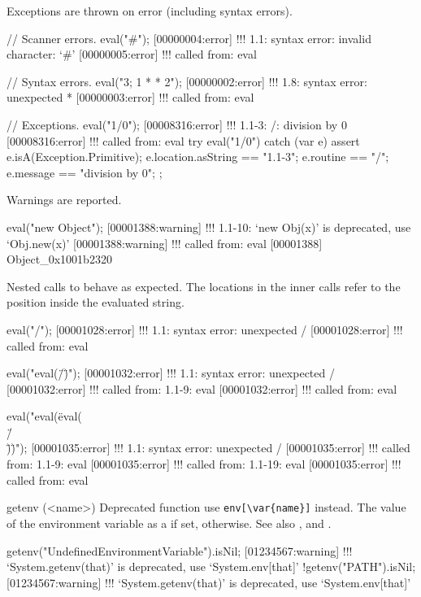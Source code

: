 \begin{urbiscriptapi}
  Exceptions are thrown on error (including syntax errors).
\begin{urbiscript}
// Scanner errors.
eval("#");
[00000004:error] !!! 1.1: syntax error: invalid character: `#'
[00000005:error] !!!    called from: eval

// Syntax errors.
eval("3; 1 * * 2");
[00000002:error] !!! 1.8: syntax error: unexpected *
[00000003:error] !!!    called from: eval

// Exceptions.
eval("1/0");
[00008316:error] !!! 1.1-3: /: division by 0
[00008316:error] !!!    called from: eval
try
{
  eval("1/0")
}
catch (var e)
{
  assert
  {
    e.isA(Exception.Primitive);
    e.location.asString  == "1.1-3";
    e.routine            == "/";
    e.message            == "division by 0";
  }
};
\end{urbiscript}

  Warnings are reported.

\begin{urbiscript}
eval("new Object");
[00001388:warning] !!! 1.1-10: `new Obj(x)' is deprecated, use `Obj.new(x)'
[00001388:warning] !!!    called from: eval
[00001388] Object_0x1001b2320
\end{urbiscript}

  Nested calls to  behave as expected.  The locations in the
  inner calls refer to the position inside the evaluated string.

\begin{urbiscript}
eval("/");
[00001028:error] !!! 1.1: syntax error: unexpected /
[00001028:error] !!!    called from: eval

eval("eval(\"/\")");
[00001032:error] !!! 1.1: syntax error: unexpected /
[00001032:error] !!!    called from: 1.1-9: eval
[00001032:error] !!!    called from: eval

eval("eval(\"eval(\\\"/\\\")\")");
[00001035:error] !!! 1.1: syntax error: unexpected /
[00001035:error] !!!    called from: 1.1-9: eval
[00001035:error] !!!    called from: 1.1-19: eval
[00001035:error] !!!    called from: eval
\end{urbiscript}


\item[getenv](<name>)%
  Deprecated function use \lstinline|env[\var{name}]| instead.
  The value of the environment variable  as a 
  if set,  otherwise.  See also , 
  and .
\begin{urbiassert}
getenv("UndefinedEnvironmentVariable").isNil;
[01234567:warning] !!! `System.getenv(that)' is deprecated, use `System.env[that]'
!getenv("PATH").isNil;
[01234567:warning] !!! `System.getenv(that)' is deprecated, use `System.env[that]'
\end{urbiassert}



\end{urbiscriptapi}
